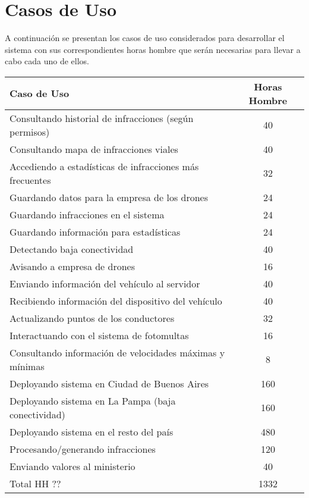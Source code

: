 \section{Casos de Uso}

A continuación se presentan los casos de uso considerados para desarrollar el sistema
con sus correspondientes horas hombre que serán necesarias para llevar a cabo 
cada uno de ellos.


\begin{table}[htb]
\begin{center}
\begin{tabular}{|l|c|}
\hline
Caso de Uso & Horas Hombre \\
\hline \hline
Consultando historial de infracciones (según permisos) & 40 \\ \hline
Consultando mapa de infracciones viales & 40 \\ \hline
Accediendo a estadísticas de infracciones más frecuentes & 32 \\ \hline
Guardando datos para la empresa de los drones & 24 \\ \hline
Guardando infracciones en el sistema & 24 \\ \hline
Guardando información para estadísticas & 24 \\ \hline
Detectando baja conectividad & 40 \\ \hline
Avisando a empresa de drones & 16 \\ \hline
Enviando información del vehículo al servidor & 40 \\ \hline
Recibiendo información del dispositivo del vehículo & 40 \\ \hline
Actualizando puntos de los conductores & 32 \\ \hline
Interactuando con el sistema de fotomultas & 16 \\ \hline
Consultando información de velocidades máximas y mínimas & 8 \\ \hline
Deployando sistema en Ciudad de Buenos Aires & 160 \\ \hline
Deployando sistema en La Pampa (baja conectividad) & 160 \\ \hline
Deployando sistema en el resto del país & 480 \\ \hline
Procesando/generando infracciones & 120 \\ \hline
Enviando valores al ministerio & 40 \\ \hline
Total HH ?? & 1332 \\ \hline
\end{tabular}
\label{tabla:sencilla}
\end{center}
\end{table}
